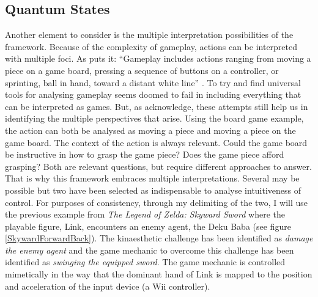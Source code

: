 \subsection{Quantum States}
Another element to consider is the multiple interpretation possibilities of the framework. Because of the complexity of gameplay, actions can be interpreted with multiple foci. As  puts it: ``Gameplay includes actions ranging from moving a piece on a game board, pressing a sequence of buttons on a controller, or sprinting, ball in hand, toward a distant white line'' \cite[p. 8]{calleja}. To try and find universal tools for analysing gameplay seems doomed to fail in including everything that can be interpreted as games. But, as \cite{calleja} acknowledge, these attempts still help us in identifying the multiple perspectives that arise. Using the board game example, the action can both be analysed as moving a piece and moving a piece on the game board. The context of the action is always relevant. Could the game board be instructive in how to grasp the game piece? Does the game piece afford grasping? Both are relevant questions, but require different approaches to answer. That is why this framework embraces multiple interpretations. Several may be possible but two have been selected as indispensable to analyse intuitiveness of control. For purposes of consistency, through my delimiting of the two, I will use the previous example from \textit{The Legend of Zelda: Skyward Sword} \cite{skyward} where the playable figure, Link, encounters an enemy agent, the Deku Baba (see figure \ref{SkywardForwardBack}). The kinaesthetic challenge has been identified as \textit{damage the enemy agent} and the game mechanic to overcome this challenge has been identified as \textit{swinging the equipped sword}. The game mechanic is controlled mimetically in the way that the dominant hand of Link is mapped to the position and acceleration of the input device (a Wii controller).

